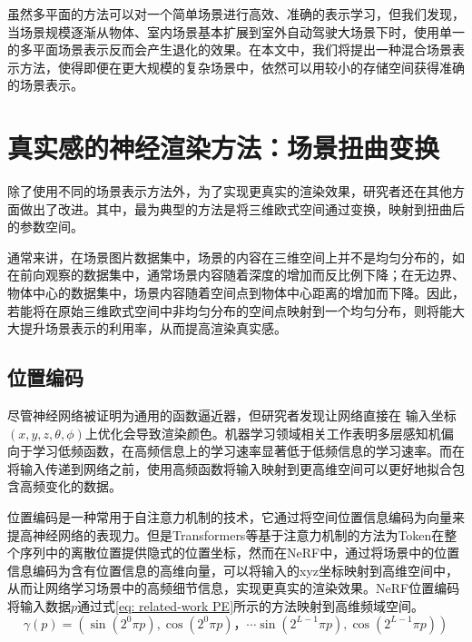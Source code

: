 虽然多平面的方法可以对一个简单场景进行高效、准确的表示学习，但我们发现，当场景规模逐渐从物体、室内场景基本扩展到室外自动驾驶大场景下时，使用单一的多平面场景表示反而会产生退化的效果。在本文中，我们将提出一种混合场景表示方法，使得即便在更大规模的复杂场景中，依然可以用较小的存储空间获得准确的场景表示。

\newpage
\section{真实感的神经渲染方法：场景扭曲变换}
\label{sec: related-work realistic rendering}
除了使用不同的场景表示方法外，为了实现更真实的渲染效果，研究者还在其他方面做出了改进。其中，最为典型的方法是将三维欧式空间通过变换，映射到扭曲后的参数空间。

通常来讲，在场景图片数据集中，场景的内容在三维空间上并不是均匀分布的，如在前向观察的数据集中，通常场景内容随着深度的增加而反比例下降；在无边界、物体中心的数据集中，场景内容随着空间点到物体中心距离的增加而下降。因此，若能将在原始三维欧式空间中非均匀分布的空间点映射到一个均匀分布，则将能大大提升场景表示的利用率，从而提高渲染真实感。

\subsection{位置编码}
\label{sec: related-work positional encoding}

尽管神经网络被证明为通用的函数逼近器\cite{hornik_multilayer_1989}，但研究者发现让网络直接在 输入坐标$(x,y,z,\theta,\phi)$上优化会导致渲染颜色。机器学习领域相关工作\cite{rahaman_spectral_2019}表明多层感知机偏向于学习低频函数，在高频信息上的学习速率显著低于低频信息的学习速率。而在将输入传递到网络之前，使用高频函数将输入映射到更高维空间可以更好地拟合包含高频变化的数据。

位置编码是一种常用于自注意力机制的技术，它通过将空间位置信息编码为向量来提高神经网络的表现力。但是Transformers\cite{vaswani_attention_2017}等基于注意力机制的方法为Token在整个序列中的离散位置提供隐式的位置坐标，然而在NeRF\cite{mildenhall_nerf_2020}中，通过将场景中的位置信息编码为含有位置信息的高维向量，可以将输入的xyz坐标映射到高维空间中，从而让网络学习场景中的高频细节信息，实现更真实的渲染效果。NeRF位置编码将输入数据$p$通过式\ref{eq: related-work PE}所示的方法映射到高维频域空间。
\begin{equation}
    \gamma(p) = \left(\sin(2^0\pi p),\cos(2^0\pi p)，\cdots \sin(2^{L-1}\pi p),\cos(2^{L-1}\pi p)\right)
    \label{eq: related-work PE}
\end{equation}

